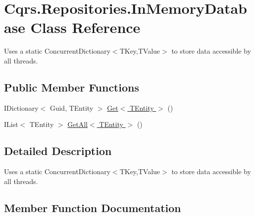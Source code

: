 \hypertarget{classCqrs_1_1Repositories_1_1InMemoryDatabase}{}\section{Cqrs.\+Repositories.\+In\+Memory\+Database Class Reference}
\label{classCqrs_1_1Repositories_1_1InMemoryDatabase}


Uses a static Concurrent\+Dictionary$<$\+T\+Key,\+T\+Value$>$ to store data accessible by all threads.  


\subsection*{Public Member Functions}
\begin{DoxyCompactItemize}
\item 
I\+Dictionary$<$ Guid, T\+Entity $>$ \hyperlink{classCqrs_1_1Repositories_1_1InMemoryDatabase_aef212725bb71dfe3a380de20843ed0e5_aef212725bb71dfe3a380de20843ed0e5}{Get$<$ T\+Entity $>$} ()
\item 
I\+List$<$ T\+Entity $>$ \hyperlink{classCqrs_1_1Repositories_1_1InMemoryDatabase_a83104b325c203f6768bb8ffd2c9c3381_a83104b325c203f6768bb8ffd2c9c3381}{Get\+All$<$ T\+Entity $>$} ()
\end{DoxyCompactItemize}


\subsection{Detailed Description}
Uses a static Concurrent\+Dictionary$<$\+T\+Key,\+T\+Value$>$ to store data accessible by all threads. 



\subsection{Member Function Documentation}
\mbox{\label{classCqrs_1_1Repositories_1_1InMemoryDatabase_aef212725bb71dfe3a380de20843ed0e5_aef212725bb71dfe3a380de20843ed0e5}} 
